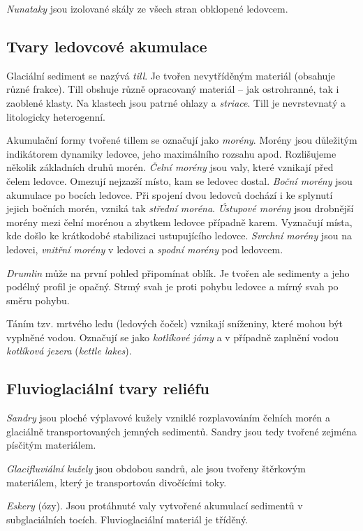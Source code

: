 \emph{Nunataky} jsou izolované skály ze všech stran obklopené ledovcem.

\subsection{Tvary ledovcové akumulace}
Glaciální sediment se nazývá \emph{till}. Je tvořen nevytříděným materiál (obsahuje různé frakce). Till obshuje různě opracovaný materiál -- jak ostrohranné, tak i zaoblené klasty. Na klastech jsou patrné ohlazy a \emph{striace}. Till je nevrstevnatý a litologicky heterogenní.

Akumulační formy tvořené tillem se označují jako \emph{morény}. Morény jsou důležitým indikátorem dynamiky ledovce, jeho maximálního rozsahu apod. Rozlišujeme několik základních druhů morén. \emph{Čelní morény} jsou valy, které vznikají před čelem ledovce. Omezují nejzazší místo, kam se ledovec dostal. \emph{Boční morény} jsou akumulace po bocích ledovce. Při spojení dvou ledovců dochází i ke splynutí jejich bočních morén, vzniká tak \emph{střední moréna}. \emph{Ústupové morény} jsou drobnější morény mezi čelní morénou a zbytkem ledovce případně karem. Vyznačují místa, kde došlo ke krátkodobé stabilizaci ustupujícího ledovce. \emph{Svrchní morény} jsou na ledovci, \emph{vnitřní morény} v ledovci a \emph{spodní morény} pod ledovcem.

\emph{Drumlin} může na první pohled připomínat oblík. Je tvořen ale sedimenty a jeho podélný profil je opačný. Strmý svah je proti pohybu ledovce a mírný svah po směru pohybu. 

Táním tzv. mrtvého ledu (ledových čoček) vznikají sníženiny, které mohou být vyplněné vodou. Označují se jako \emph{kotlíkové jámy} a v případně zaplnění vodou \emph{kotlíková jezera} (\textit{kettle lakes}).

\subsection{Fluvioglaciální tvary reliéfu}
\emph{Sandry} jsou ploché výplavové kužely vzniklé rozplavováním čelních morén a glaciálně transportovaných jemných sedimentů. Sandry jsou tedy tvořené zejména písčitým materiálem. 

\emph{Glacifluviální kužely} jsou obdobou sandrů, ale jsou tvořeny štěrkovým materiálem, který je transportován divočícími toky.

\emph{Eskery} (ózy). Jsou protáhnuté valy vytvořené akumulací sedimentů v subglaciálních tocích. Fluvioglaciální materiál je tříděný.

